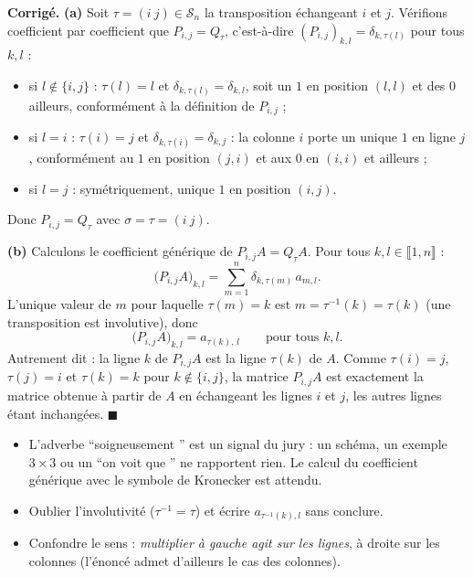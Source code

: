 \documentclass[11pt,a4paper]{article}
\newenvironment{corrige}
  {\par\medskip\noindent
   \begin{tcolorbox}[blanker, breakable,
     borderline west={2.5pt}{0pt}{vertP},
     left=10pt, top=2pt, bottom=2pt]
   {\color{vertP}\bfseries Corrigé.}\hspace{0.5em}\ignorespaces}
  {\hfill$\blacksquare$\end{tcolorbox}\medskip}
\newcommand{\og}{``}
\newcommand{\fg}{''}
\newcommand{\Perm}[1][n]{\mathcal{S}_{#1}} %
\newcommand{\ii}[2]{\llbracket #1,#2\rrbracket}
\begin{document}
\begin{corrige}
\textbf{(a)} Soit $\tau=(i\ j)\in\Perm$ la transposition échangeant
$i$ et $j$. Vérifions coefficient par coefficient que
$P_{i,j}=Q_\tau$, c'est-à-dire $(P_{i,j})_{k,l}=\delta_{k,\tau(l)}$
pour tous $k,l$ :
\begin{itemize}[leftmargin=1.6em, itemsep=1pt]
\item si $l\notin\{i,j\}$ : $\tau(l)=l$ et
$\delta_{k,\tau(l)}=\delta_{k,l}$, soit un $1$ en position $(l,l)$ et
des $0$ ailleurs, conformément à la définition de $P_{i,j}$ ;
\item si $l=i$ : $\tau(i)=j$ et $\delta_{k,\tau(i)}=\delta_{k,j}$ :
la colonne $i$ porte un unique $1$ en ligne $j$, conformément au
$1$ en position $(j,i)$ et aux $0$ en $(i,i)$ et ailleurs ;
\item si $l=j$ : symétriquement, unique $1$ en position $(i,j)$.
\end{itemize}
Donc $P_{i,j}=Q_\tau$ avec $\sigma=\tau=(i\ j)$.

\textbf{(b)} Calculons le coefficient générique de $P_{i,j}A=Q_\tau A$.
Pour tous $k,l\in\ii{1}{n}$ :
\[
\big(P_{i,j}A\big)_{k,l}
=\sum_{m=1}^{n}\delta_{k,\tau(m)}\,a_{m,l} .
\]
L'unique valeur de $m$ pour laquelle $\tau(m)=k$ est
$m=\tau^{-1}(k)=\tau(k)$ (une transposition est involutive), donc
\[
\big(P_{i,j}A\big)_{k,l}=a_{\tau(k),\,l}\qquad
\text{pour tous }k,l .
\]
Autrement dit : la ligne $k$ de $P_{i,j}A$ est la ligne $\tau(k)$ de
$A$. Comme $\tau(i)=j$, $\tau(j)=i$ et $\tau(k)=k$ pour
$k\notin\{i,j\}$, la matrice $P_{i,j}A$ est exactement la matrice
obtenue à partir de $A$ en échangeant les lignes $i$ et $j$, les
autres lignes étant inchangées.
\end{corrige}

\begin{pieges}
\begin{itemize}[leftmargin=1.4em, itemsep=2pt]
\item L'adverbe \og soigneusement \fg{} est un signal du jury : un
schéma, un exemple $3\times 3$ ou un \og on voit que \fg{} ne
rapportent rien. Le calcul du coefficient générique avec le symbole
de Kronecker est attendu.
\item Oublier l'involutivité ($\tau^{-1}=\tau$) et écrire
$a_{\tau^{-1}(k),l}$ sans conclure.
\item Confondre le sens : \emph{multiplier à gauche agit sur les
lignes}, à droite sur les colonnes (l'énoncé admet d'ailleurs le cas
des colonnes).
\end{itemize}
\end{pieges}
\end{document}
